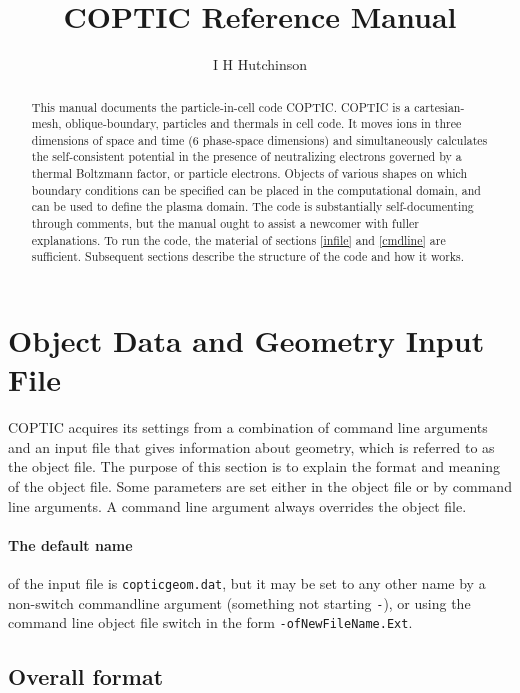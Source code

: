 \documentclass[12pt]{article}
\title{COPTIC Reference Manual}
\author{I H Hutchinson}
\begin{document}
\maketitle
\begin{abstract}
  
  This manual documents the particle-in-cell code COPTIC. COPTIC is a
  cartesian-mesh, oblique-boundary, particles and thermals in cell
  code.  It moves ions in three dimensions of space and time (6
  phase-space dimensions) and simultaneously calculates the
  self-consistent potential in the presence of neutralizing electrons
  governed by a thermal Boltzmann factor, or particle
  electrons. Objects of various shapes on which boundary conditions
  can be specified can be placed in the computational domain, and can
  be used to define the plasma domain. The code is substantially
  self-documenting through comments, but the manual ought to assist a
  newcomer with fuller explanations. To run the code, the material of
  sections \ref{infile} and \ref{cmdline} are sufficient. Subsequent
  sections describe the structure of the code and how it works.
\end{abstract}


\tableofcontents


\section{Object Data and Geometry Input File}\label{infile}

COPTIC acquires its settings from a combination of command line
arguments and an input file that gives information about geometry,
which is referred to as the object file.  The purpose of this section
is to explain the format and meaning of the object file. Some
parameters are set either in the object file or by command line
arguments. A command line argument always overrides the object file.


\paragraph{The default name} of the input file is \verb!copticgeom.dat!, but it
may be set to any other name by a non-switch commandline argument
(something not starting \verb!-!), or using the command line object file
switch in the form \verb!-ofNewFileName.Ext!.

\subsection{Overall format}
\end{document}
